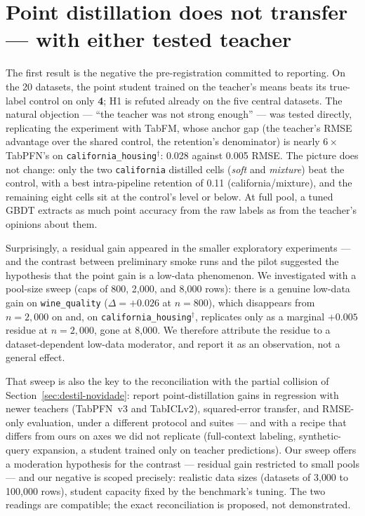 \section{Point distillation does not transfer --- with either tested teacher}
\label{sec:destil-ponto}

The first result is the negative the pre-registration committed to
reporting. On the 20 datasets, the point student trained on the
teacher's means beats its true-label control on only \textbf{4}; H1
is refuted already on the five central datasets. The natural
objection --- ``the teacher was not strong enough'' --- was tested
directly, replicating the experiment with TabFM, whose anchor gap
(the teacher's RMSE advantage over the shared control, the
retention's denominator) is nearly $6\times$ TabPFN's on
\texttt{california\_\allowbreak housing}$^\dagger$: 0.028 against
0.005 RMSE. The picture does not change: only the two
\texttt{california} distilled cells (\emph{soft} and
\emph{mixture}) beat the control, with a best
intra-pipeline retention of 0.11 (california/mixture), and the
remaining eight cells sit at the control's level or below. At full
pool, a tuned GBDT extracts as much point accuracy from the raw
labels as from the teacher's opinions about them.

Surprisingly, a residual gain appeared in the smaller exploratory
experiments --- and the contrast between preliminary smoke runs and
the pilot
suggested the hypothesis that the point gain is a low-data
phenomenon. We investigated with a pool-size sweep (caps of 800,
2{,}000, and 8{,}000 rows): there is a genuine low-data gain on
\texttt{wine\_quality} ($\Delta = +0.026$ at $n{=}800$), which
disappears from $n{=}2{,}000$ on and, on
\texttt{california\_\allowbreak housing}$^\dagger$, replicates
only as a marginal $+0.005$ residue at $n{=}2{,}000$, gone at
8{,}000. We therefore
attribute the residue to a dataset-dependent low-data moderator, and
report it as an observation, not a general effect.

That sweep is also the key to the reconciliation with the partial
collision of Section~\ref{sec:destil-novidade}: \citet{jeong2026}
report point-distillation gains in regression with newer teachers
(TabPFN~v3 and TabICLv2), squared-error transfer, and
RMSE-only evaluation, under a different protocol and suites --- and
with a recipe that differs from ours on axes we did not replicate
(full-context labeling, synthetic-query expansion, a student trained
only on teacher predictions). Our sweep offers a moderation
hypothesis for the contrast --- residual gain restricted to small
pools --- and our negative is scoped precisely: realistic data sizes
(datasets of 3{,}000 to 100{,}000 rows), student capacity fixed by
the benchmark's tuning. The two readings are compatible; the exact
reconciliation is proposed, not demonstrated.

